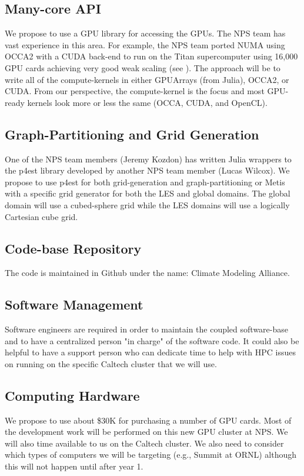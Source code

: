 \documentclass[12pt]{article}
\begin{document}
\subsection{Many-core API}
\label{sec:computing_aspects/manycore}
We propose to use a GPU library for accessing the GPUs. The NPS team has vast experience in this area. For example, the NPS team ported NUMA using OCCA2 with a CUDA back-end to run on the Titan supercomputer using 16,000 GPU cards achieving very good weak scaling (see \cite{abdi:2016b,abdi:2018}). The approach will be to write all of the compute-kernels in either GPUArrays (from Julia), OCCA2, or CUDA. From our perspective, the compute-kernel is the focus and most GPU-ready kernels look more or less the same (OCCA, CUDA, and OpenCL). 

\subsection{Graph-Partitioning and Grid Generation}
One of the NPS team members (Jeremy Kozdon) has written Julia wrappers to the p4est library developed by another NPS team member (Lucas Wilcox).  We propose to use p4est for both grid-generation and graph-partitioning or Metis with a specific grid generator for both the LES and global domains. The global domain will use a cubed-sphere grid while the LES domains will use a logically Cartesian cube grid.

\subsection{Code-base Repository}
The code is maintained in Github under the name: Climate Modeling Alliance.

\subsection{Software Management}
Software engineers are required in order to maintain the coupled software-base and to have a centralized person "in charge" of the software code.  It could also be helpful to have a support person who can dedicate time to help with HPC issues on running on the specific Caltech cluster that we will use.  

\subsection{Computing Hardware}
We propose to use about \$30K for purchasing a number of GPU cards.  Most of the development work will be performed on this new GPU cluster at NPS.  We will also  time available to us on the Caltech cluster. We also need to consider which types of computers we will be targeting (e.g., Summit at ORNL) although this will not happen until after year 1.
\end{document}
